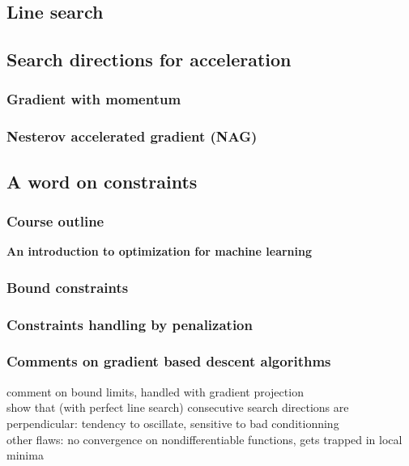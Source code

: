 \documentclass[12pt]{beamer}
\begin{document}
\subsection{Line search}

\subsection{Search directions for acceleration}

\begin{frame}
\frametitle{Gradient with momentum} 
\wip
\end{frame}

\begin{frame}
\frametitle{Nesterov accelerated gradient (NAG)} 
\wip
\end{frame}

\subsection{A word on constraints}

\begin{frame}%
\frametitle{Course outline} 
\begin{center} \textbf{An introduction to optimization for machine learning} \end{center}
\tableofcontents[currentsection]
\end{frame}

\begin{frame}
\frametitle{Bound constraints} 
\wip
\end{frame}

\begin{frame}
\frametitle{Constraints handling by penalization} 
\wip
\end{frame}

\begin{frame}
\frametitle{Comments on gradient based descent algorithms} 
\wip
comment on bound limits, handled with gradient projection\\
show that (with perfect line search) consecutive search directions are perpendicular: tendency to oscillate, sensitive to bad conditionning\\
other flaws: no convergence on nondifferentiable functions, gets trapped in local minima
\end{frame}
\end{document}
